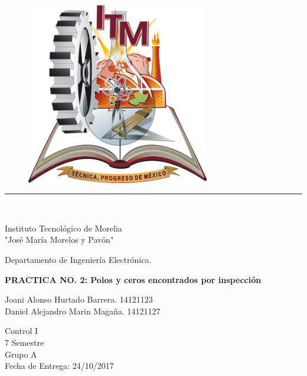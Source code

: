 \documentclass{report}
\newcounter{ns}
\begin{document}
	\begin{titlepage}
		\begin{center}
			\vspace*{0in}
			\begin{figure}[htb]
				\begin{center}
					\includegraphics[width=8cm]{0}
				\end{center}
			\end{figure}
			\rule{80mm}{0.1mm}\\
			\vspace*{0.1in}
			\begin{Large}
				Instituto Tecnológico de Morelia\\
				"José María Morelos y Pavón"\\
			\end{Large}
			\vspace*{0.15in}
			\begin{Large}
				Departamento de Ingeniería Electrónica.\\
			\end{Large}
			\vspace*{0.4in}
			\begin{Large}
				\textbf{PRACTICA NO. 2: Polos y ceros encontrados por inspección} \\
				\end{Large}
			\vspace*{0.3in}
			\begin{Large}
				Joani Alonso Hurtado Barrera. 14121123\\
				Daniel Alejandro Marin Magaña. 14121127\\
			\end{Large}
			\vspace*{0.1in}
			\begin{Large}
				Control I\\
				7 Semestre\\
				Grupo A\\
				Fecha de Entrega: 24/10/2017\\
			\end{Large}
		\end{center}		
	\end{titlepage}
\end{document}
